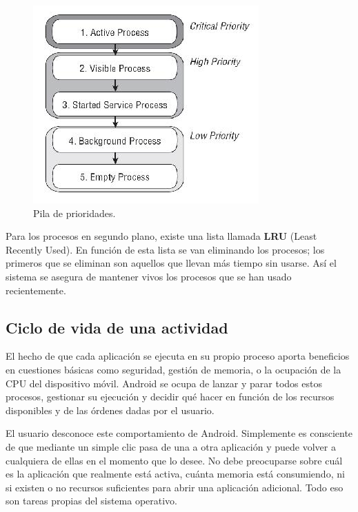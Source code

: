 \documentclass[letterpaper,12pt,openany,oneside]{book}
\begin{document}
\begin{figure}[!ht]
  \centering
    \includegraphics[width=1\textwidth\ ,angle=0]{procesosAndroid.jpg}
  \caption{Pila de prioridades.}
  \label{fig:Pila de prioridades. }
\end{figure}
  Para los procesos en segundo plano, existe una lista llamada \textbf{LRU }(Least Recently Used). En función de esta lista se van eliminando los procesos; los primeros que se eliminan son aquellos que llevan más tiempo sin usarse. Así el sistema se asegura de mantener vivos los procesos que se han usado recientemente.

\subsection{ Ciclo de vida de una actividad}
 El hecho de que cada aplicación se ejecuta en su propio proceso aporta beneficios en cuestiones básicas como seguridad, gestión de memoria, o la ocupación de la CPU del dispositivo móvil. Android se ocupa de lanzar y parar todos estos procesos, gestionar su ejecución y decidir qué hacer en función de los recursos disponibles y de las órdenes dadas por el usuario. 

   El usuario desconoce este comportamiento de Android. Simplemente es consciente de que mediante un simple clic pasa de una a otra aplicación y puede volver a cualquiera de ellas en el momento que lo desee. No debe preocuparse sobre cuál es la aplicación que realmente está activa, cuánta memoria está consumiendo, ni si existen o no recursos suficientes para abrir una aplicación adicional. Todo eso son tareas propias del sistema operativo. 
\end{document}
